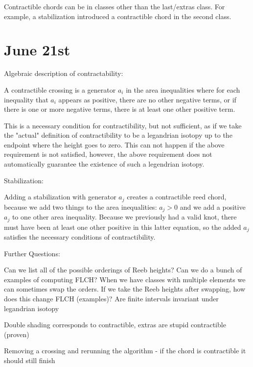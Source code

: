 \documentclass[11pt]{amsart}
\begin{document}
Contractible chords can be in classes other than the last/extras class. For example, a stabilization introduced a contractible chord in the second class.









\section{June 21st}


Algebraic description of contractability:

A contractible crossing is a generator $a_i$ in the area inequalities where for each inequality that $a_i$ appears as positive, there are no other negative terms, or if there is one or more negative terms, there is at least one other positive term.

This is a necessary condition for contractibility, but not sufficient, as if we take the "actual" definition of contractibility to be a legandrian isotopy up to the endpoint where the height goes to zero. This can not happen if the above requirement is not satisfied, however, the above requirement does not automatically guarantee the existence of such a legendrian isotopy. 


Stabilization:

Adding a stabilization with generator $a_j$ creates a contractible reed chord, because we add two things to the area inequalities: $a_j>0$ and we add a positive $a_j$ to one other area inequality. Because we previously had a valid knot, there must have been at least one other positive in this latter equation, so the added $a_j$ satisfies the necessary conditions of contractibility. 




Further Questions:



Can we list all of the possible orderings of Reeb heights?
Can we do a bunch of examples of computing FLCH?
When we have classes with multiple elements we can sometimes swap the orders. If we take the Reeb heights after swapping, how does this change FLCH (examples)?
Are finite intervals invariant under legandrian isotopy

Double shading corresponds to contractible, extras are stupid contractible (proven)


Removing a crossing and rerunning the algorithm - if the chord is contractible it should still finish
\end{document}
